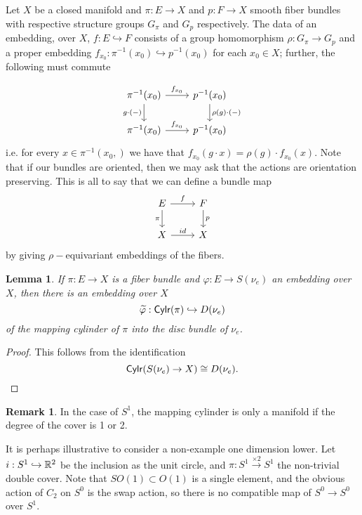 \documentclass[a4paper, 12 pt, reqno]{amsart}
\newtheorem{lemma}[theorem]{Lemma}
\theoremstyle{definition}
\newtheorem{remark}[theorem]{Remark}
\theoremstyle{remark}
\DeclareMathOperator{\cylr}{{\sf Cylr}}
\begin{document}
Let $X$ be a closed manifold and $\pi : E \to X$ and $p : F \to X$ smooth fiber bundles with respective structure groups $G_\pi$ and $G_p$ respectively. The data of an embedding, over $X$, $f: E \hookrightarrow F$ consists of a group homomorphism $\rho : G_\pi \to G_p$ and a proper embedding $f_{x_{0}}: \pi^{-1} (x_0) \hookrightarrow p^{-1} (x_0)$ for each $x_0 \in X$; further, the following must commute

\[\begin{tikzcd}
\pi^{-1} (x_0) \arrow{r}{f_{x_{0}}} \arrow[swap]{d}{g \cdot (-)} & p^{-1} (x_0) \arrow{d}{\rho(g) \cdot (-)} \\
\pi^{-1} (x_0) \arrow{r}{f_{x_{0}}} & p^{-1} (x_0)
\end{tikzcd}
\] i.e. for every $x \in \pi^{-1}(x_{0},)$ we have that $f_{x_{0}}(g \cdot x) = \rho(g) \cdot f_{x_{0}}(x).$ Note that if our bundles are oriented, then we may ask that the actions are orientation preserving. This is all to say that we can define a bundle map \[\begin{tikzcd}
E \arrow{r}{f} \arrow[swap]{d}{\pi} & F \arrow{d}{p} \\
X \arrow{r}{id} & X
\end{tikzcd}
\] by giving $\rho-$equivariant embeddings of the fibers.


\begin{lemma}
If $\pi : E \to X$ is a fiber bundle and $\varphi: E \to S(\nu_e)$ an embedding over $X$, then there is an embedding over $X$
\[
\widetilde{\varphi} : \cylr (\pi) \hookrightarrow D(\nu_e)
\]
of the mapping cylinder of $\pi$ into the disc bundle of $\nu_e$.
\end{lemma}

\begin{proof}
This follows from the identification
\[
\cylr(S(\nu_e) \to X) \cong D(\nu_e).
\]
\end{proof}

\begin{remark}
In the case of $S^1$, the mapping cylinder is only a manifold if the degree of the cover is 1 or 2.
\end{remark}

It is perhaps illustrative to consider a non-example one dimension lower. Let $i : S^1 \hookrightarrow \mathbb R^2$ be the inclusion as the unit circle, and $\pi : S^1 \xrightarrow{\times 2} S^1$ the non-trivial double cover. Note that $SO(1) \subset O(1)$ is a single element, and the obvious action of $C_2$ on $S^0$ is the swap action, so there is no compatible map of $S^0 \to S^0$ over $S^1$. 
\end{document}
